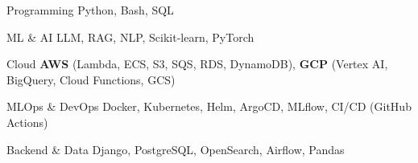 

\begin{cvskills}

  \cvskill
    {Programming} %
    {Python, Bash, SQL} %

  \cvskill
    {ML \& AI} %
    {LLM, RAG, NLP, Scikit-learn, PyTorch} %

  \cvskill
    {Cloud} %
    {\textbf{AWS} (Lambda, ECS, S3, SQS, RDS, DynamoDB), \textbf{GCP} (Vertex AI, BigQuery, Cloud Functions, GCS)} %

  \cvskill
    {MLOps \& DevOps} %
    {Docker, Kubernetes, Helm, ArgoCD, MLflow, CI/CD (GitHub Actions)} %

  \cvskill
    {Backend \& Data} %
    {Django, PostgreSQL, OpenSearch, Airflow, Pandas} %

\end{cvskills}
